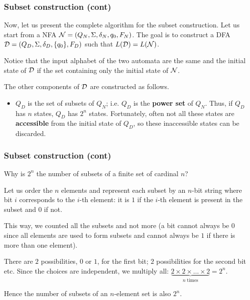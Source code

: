 %
\begin{frame}
\frametitle{Subset construction (cont)}

Now, let us present the complete algorithm for the subset
construction. Let us start from a NFA \({\cal N} = (Q_N, \Sigma,
\delta_N, q_0, F_N)\). The goal is to construct a DFA \({\cal D} =
(Q_D, \Sigma, \delta_D, \{q_0\}, F_D)\) such that \(L({\cal D}) =
L({\cal N})\).

\bigskip

Notice that the input alphabet of the two automata are the same and
the initial state of \({\cal D}\) if the set containing only the
initial state of \({\cal N}\).

\bigskip

The other components of \({\cal D}\) are constructed as follows.
\begin{itemize}

  \item \(Q_D\) is the set of subsets of \(Q_N\); i.e. \(Q_D\) is the
  \textbf{power set} of \(Q_N\). Thus, if \(Q_D\) has \(n\) states,
  \(Q_D\) has \(2^n\) states. Fortunately, often not all these states
  are \textbf{accessible} from the initial state of \(Q_D\), so these
  inaccessible states can be discarded.

\end{itemize}

\end{frame}

%
\begin{frame}
\frametitle{Subset construction (cont)}

\label{state_explosion}

Why is \(2^n\) the number of subsets of a finite set of cardinal
\(n\)?

\bigskip

Let us order the \(n\) elements and represent each subset by an
\(n\)-bit string where bit \(i\) corresponds to the \(i\)-th element:
it is \(1\) if the \(i\)-th element is present in the subset and \(0\)
if not.

\bigskip

This way, we counted all the subsets and not more (a bit cannot always
be \(0\) since all elements are used to form subsets and cannot always
be \(1\) if there is more than one element).

There are \(2\) possibilities, \(0\) or \(1\), for the first bit;
\(2\) possibilities for the second bit etc. Since the choices are
independent, we multiply all: \(\underbrace{2 \times 2 \times
  \dots \times 2}_{n \; \text{times}} = 2^n\).

\bigskip

Hence the number of subsets of an \(n\)-element set is also \(2^n\).

\end{frame}

